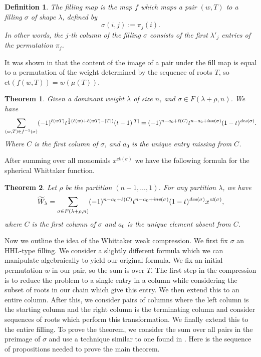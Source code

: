 \documentclass[11pt]{amsart}
\newtheorem{definition}{Definition}[section]
\newtheorem{theorem}{Theorem}[section]
\begin{document}
{\begin{definition}
The \emph{filling map} is the map $f$ which maps a pair $(w,T)$ to a filling $\sigma$ of shape $\lambda$, defined by $$\sigma(i,j):=\pi_{j}(i).$$ In other words, the $j$-th column of the filling $\sigma$ consists of the first $\lambda'_{j}$ entries of the permutation $\pi_{j}$. 
\end{definition}
It was shown in \cite[Proposition 3.6]{CL1} that the content of the image of a pair under the fill map is equal to a permutation of the weight determined by the sequence of roots $T$, so $\textrm{ct}(f(w,T))=w(\mu(T))$.  
\begin{theorem}\label{whittaker}
Given a dominant weight $\lambda$ of size $n$, and $\sigma \in F(\lambda+\rho, n)$. We have \begin{equation*}
\sum_{(w,T) \in f^{-1}(\sigma)} (-1)^{\ell(wT)}t^{\frac{1}{2}(\ell(w)+\ell(wT)-|T|)}(t-1)^{|T|}=(-1)^{n-a_{0}+\ell(C)}t^{n-a_{0}+\emph{inv}(\sigma)}(1-t)^{\emph{des}(\sigma)}.
\end{equation*}
Where $C$ is the first column of $\sigma$, and $a_{0}$ is the unique entry missing from $C$.
\end{theorem}
After summing over all monomials $x^{\text{ct}(\sigma)}$ we have the following formula for the spherical Whittaker function. 
\begin{theorem}
Let $\rho$ be the partition $(n-1,\ldots,1)$. For any partition $\lambda$, we have
\begin{equation*}
\widetilde{W}_{\lambda}=\sum_{\sigma \in F(\lambda+\rho, n)}(-1)^{n-a_{0}+\ell(C)}t^{n-a_{0}+\emph{inv}(\sigma)}(1-t)^{\emph{des}(\sigma)}x^{\emph{ct}(\sigma)},
\end{equation*}
where $C$ is the first column of $\sigma$ and $a_{0}$ is the unique element absent from $C$.
\end{theorem}
Now we outline the idea of the Whittaker weak compression. We first fix $\sigma$ an HHL-type filling. We consider a slightly different formula which we can manipulate algebraically to yield our original formula. We fix an initial permutation $w$ in our pair, so the sum is over $T$. The first step in the compression is to reduce the problem to a single entry in a column while considering the subset of roots in our chain which give this entry. We then extend this to an entire column. After this, we consider pairs of columns where the left column is the starting column and the right column is the terminating column and consider sequences of roots which perform this transformation. We finally extend this to the entire filling. To prove the theorem, we consider the sum over all pairs in the preimage of $\sigma$ and use a technique similar to one found in \cite{CL1}. Here is the sequence of propositions needed to prove the main theorem. 
\begin{center}
\end{center}
}
\end{document}
